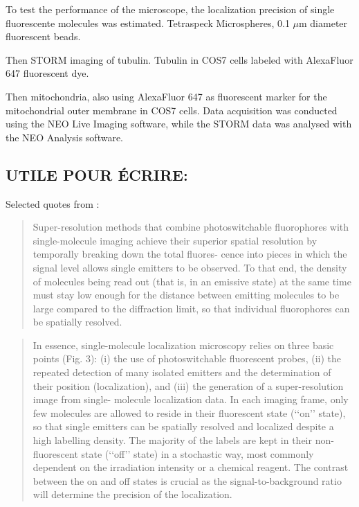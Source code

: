 To test the performance of the microscope, the localization precision of single fluorescente molecules was estimated.
Tetraspeck Microspheres, 0.1 $\mu$m diameter fluorescent beads.

Then STORM imaging of tubulin. Tubulin in COS7 cells labeled with AlexaFluor 647 fluorescent dye.

Then mitochondria, also using AlexaFluor 647 as fluorescent marker for the mitochondrial outer membrane in COS7 cells.
Data acquisition was conducted using the NEO Live Imaging software, while the STORM data was analysed with the NEO Analysis software.


\subsection{UTILE POUR ÉCRIRE:}
Selected quotes from \cite{furstenberg_single-molecule_2013}:
\begin{quote}
    Super-resolution methods that combine photoswitchable
    fluorophores with single-molecule imaging achieve their superior
    spatial resolution by temporally breaking down the total fluores-
    cence into pieces in which the signal level allows single emitters to
    be observed. To that end, the density of molecules being read out
    (that is, in an emissive state) at the same time must stay low
    enough for the distance between emitting molecules to be large
    compared to the diﬀraction limit, so that individual fluorophores
    can be spatially resolved. \cite{furstenberg_single-molecule_2013}
\end{quote}
\begin{quote}
    In essence, single-molecule localization microscopy relies on
    three basic points (Fig. 3): (i) the use of photoswitchable
    fluorescent probes, (ii) the repeated detection of many isolated
    emitters and the determination of their position (localization),
    and (iii) the generation of a super-resolution image from single-
    molecule localization data. In each imaging frame, only few
    molecules are allowed to reside in their fluorescent state
    (‘‘on’’ state), so that single emitters can be spatially resolved
    and localized despite a high labelling density. The majority of
    the labels are kept in their non-fluorescent state (‘‘oﬀ’’ state) in
    a stochastic way, most commonly dependent on the irradiation
    intensity or a chemical reagent. The contrast between the on
    and oﬀ states is crucial as the signal-to-background ratio will
    determine the precision of the localization. \cite{furstenberg_single-molecule_2013}
\end{quote}
